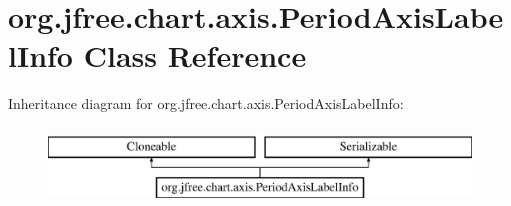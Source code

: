 \hypertarget{classorg_1_1jfree_1_1chart_1_1axis_1_1_period_axis_label_info}{}\section{org.\+jfree.\+chart.\+axis.\+Period\+Axis\+Label\+Info Class Reference}
\label{classorg_1_1jfree_1_1chart_1_1axis_1_1_period_axis_label_info}
Inheritance diagram for org.\+jfree.\+chart.\+axis.\+Period\+Axis\+Label\+Info\+:\begin{figure}[H]
\begin{center}
\leavevmode
\includegraphics[height=2.000000cm]{classorg_1_1jfree_1_1chart_1_1axis_1_1_period_axis_label_info}
\end{center}
\end{figure}
